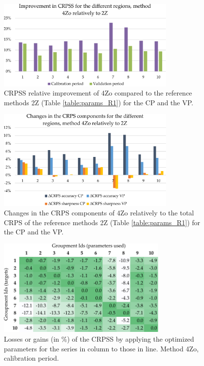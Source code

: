 \documentclass[review]{elsarticle}
\begin{document}
\begin{figure}[htb]
	\centerline{\includegraphics[width=8.8cm]{figures/fig03.pdf}}
	\caption{CRPSS relative improvement of 4Zo compared to the reference methods 2Z (Table \ref{table:params_R1}) for the CP and the VP.}
	\label{fig:figure_dcrpss_4Zo}
\end{figure}

\begin{figure}[htb]
	\centerline{\includegraphics[width=8.8cm]{figures/fig04.pdf}}
	\caption{Changes in the CRPS components of 4Zo relatively to the total CRPS of the reference methods 2Z (Table \ref{table:params_R1}) for the CP and the VP.}
	\label{fig:figure_dcrps_comp_4Zo}
\end{figure}

\begin{figure}[htb]
	\centerline{\includegraphics[width=8.4cm]{figures/fig05.pdf}}
	\caption{Losses or gains (in \%) of the CRPSS by applying the optimized parameters for the series in column to those in line. Method 4Zo, calibration period.}
	\label{fig:crossing_4Zo_calib}
\end{figure}
\end{document}
